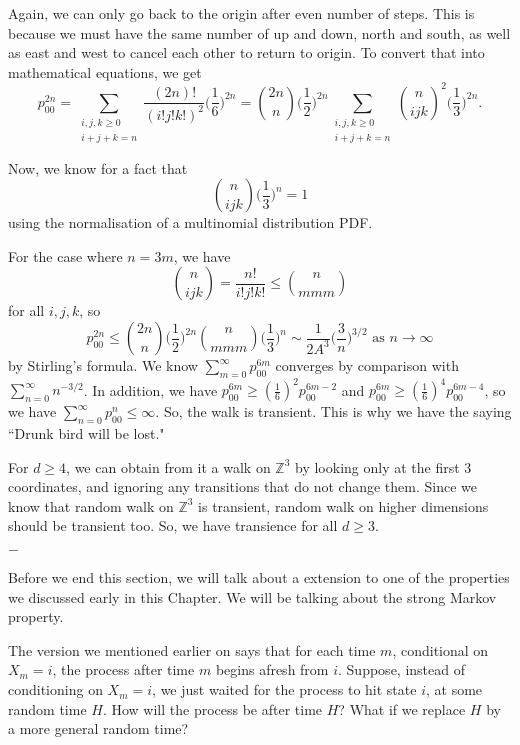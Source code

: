 \documentclass[11pt, a4paper, oneside]{book}
\theoremstyle{definition}
\def\Z{\mathbb{Z}}
\newcommand{\breaking}{%
    \begin{center}
    $-$
    \end{center}%
}
\begin{document}
\noindent Again, we can only go back to the origin after even number of steps. This is because we must have the same number of up and down, north and south, as well as east and west to cancel each other to return to origin. To convert that into mathematical equations, we get \[
p_{00}^{2n} = \sum_{\substack{i,j,k \ge 0 \\ i+j+k = n}} \frac{(2n)!}{(i!j!k!)^2} \Big( \frac{1}{6}\Big)^{2n} = \binom{2n}{n} \Big( \frac{1}{2}\Big)^{2n} \sum_{\substack{i,j,k \ge 0 \\ i+j+k = n}} \binom{n}{i j k}^2 \Big( \frac{1}{3}\Big)^{2n}.
\]

\noindent Now, we know for a fact that \[
\binom{n}{i j k} \Big( \frac{1}{3}\Big)^{n} = 1
\]
using the normalisation of a multinomial distribution PDF. 

\noindent For the case where $n = 3m$, we have \[
\binom{n}{i j k} = \frac{n!}{i!j!k!} \le \binom{n}{m m m}
\]
for all $i, j, k$, so \[
p_{00}^{2n} \le \binom{2n}{n} \Big( \frac{1}{2}\Big)^{2n}\binom{n}{m m m}\Big( \frac{1}{3}\Big)^{n} \sim \frac{1}{2A^3} \Big( \frac{3}{n}\Big)^{3/2} \text{ as } n \to \infty
\]
by Stirling's formula. We know $\sum_{m=0}^{\infty}p_{00}^{6m}$ converges by comparison with $\sum_{n=0}^{\infty} n^{-3/2}$. In addition, we have $p_{00}^{6m} \ge (\frac{1}{6})^2 p_{00}^{6m-2}$ and $p_{00}^{6m} \ge (\frac{1}{6})^4 p_{00}^{6m-4}$, so we have $\sum_{n=0}^{\infty}p_{00}^{n} \le \infty$. So, the walk is transient. This is why we have the saying ``Drunk bird will be lost."

\noindent For $d \ge 4$, we can obtain from it a walk on $\Z^3$ by looking only at the first 3 coordinates, and ignoring any transitions that do not change them. Since we know that random walk on $\Z^3$ is transient, random walk on higher dimensions should be transient too. So, we have transience for all $d \ge 3$.

\breaking

\noindent Before we end this section, we will talk about a extension to one of the properties we discussed early in this Chapter. We will be talking about the strong Markov property.

\noindent The version we mentioned earlier on says that for each time $m$, conditional on $X_m = i$, the process after time $m$ begins afresh from $i$. Suppose, instead of conditioning on $X_m = i$, we just waited for the process to hit state $i$, at some random time $H$. How will the process be after time $H$? What if we replace $H$ by a more general random time? 
\end{document}
